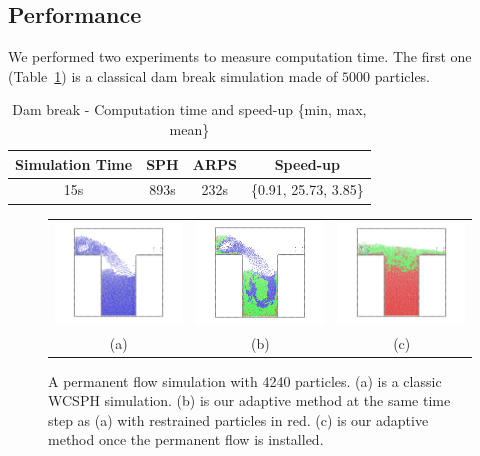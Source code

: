 \subsection{Performance}
We performed two experiments to measure computation time.
The first one (Table~\ref{table:perf1}) is a classical dam break simulation made of $5000$ particles.

\begin{table}[h!]
   \centering
\begin{tabular}{|c|c|c|c|} \hline
    Simulation Time & SPH   & ARPS    & Speed-up \\ \hline
    15s     & 893s   & 232s                 &  \{0.91, 25.73, 3.85\}\\ \hline
\end{tabular}
\caption[ARPS: Dam break - Measurements]{\label{table:perf1}Dam break - Computation time and speed-up \small{\{min, max, mean\}}}
\end{table}

\begin{figure}[!ht]
    \centering
    \begin{tabular}{ccc}
        \includegraphics[width=.32\linewidth]{images/arps-vriphys2013/PermanentFlowSPH.jpg} &
        \includegraphics[width=.32\linewidth]{images/arps-vriphys2013/PermanentFlowARPSColor.jpg} &
  \includegraphics[width=.32\linewidth]{images/arps-vriphys2013/PermanentFlowARPSColor2.jpg} \\
  (a) & (b) & (c)
    \end{tabular}
    \caption[ARPS: Permanent flow simulations]{\label{fig:permanentflow} A permanent flow simulation with 4240 particles.
    (a) is a classic WCSPH simulation. (b) is our adaptive method at the same time step as (a) with restrained particles in red. (c) is our adaptive method once the permanent flow is installed.}
\end{figure}

